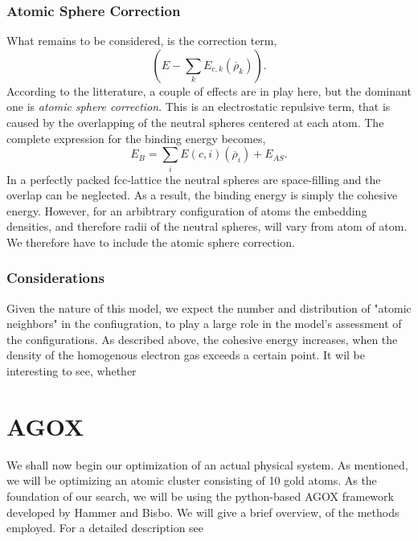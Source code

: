 \documentclass[working, oneside]{../../../Preambles/marginclass}
\begin{document}
\subsubsection{Atomic Sphere Correction}
What remains to be considered, is the correction term,
\[
\left( E - \sum_k E_{c, k}\left( \overline{\rho }_k \right)  \right) 
.\]
According to the litterature, a couple of effects are in play here, but the dominant one is \textit{atomic sphere correction}. This is an electrostatic repulsive term, that is caused by the overlapping of the neutral spheres centered at each atom. The complete expression for the binding energy becomes,
\[
E_B = \sum_i E\left( c, i \right)\left( \overline{\rho }_i \right) + E_{AS} 
.\] 
In a perfectly packed fcc-lattice the neutral spheres are space-filling and the overlap can be neglected. As a result, the binding energy is simply the cohesive energy. However, for an arbibtrary configuration of atoms the embedding densities, and therefore radii of the neutral spheres, will vary from atom of atom. We therefore have to include the atomic sphere correction.
\subsubsection{Considerations}
Given the nature of this model, we expect the number and distribution of "atomic neighbors" in the confiugration, to play a large role in the model's assessment of the configurations. As described above, the cohesive energy increases, when the density of the homogenous electron gas exceeds a certain point. It wil be interesting to see, whether 
\section{AGOX}
We shall now begin our optimization of an actual physical system. As mentioned, we will be optimizing an atomic cluster consisting of 10 gold atoms. As the foundation of our search, we will be using the python-based AGOX framework developed by Hammer and Bisbo. We will give a brief overview, of the methods employed. For a detailed description see 
\end{document}
